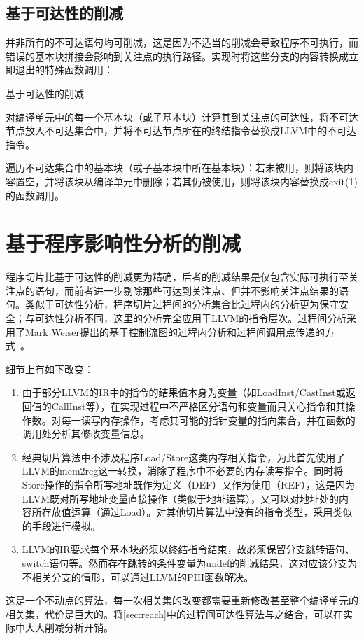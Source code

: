 \subsection{基于可达性的削减}
\label{subsec:reach-prune}

并非所有的不可达语句均可削减，这是因为不适当的削减会导致程序不可执行，而错误的基本块拼接会影响到关注点的执行路径。实现时将这些分支的内容转换成立即退出的特殊函数调用：
\begin{algorithm}\label{alg:reach-prune}
\caption{基于可达性的削减}
\SetAlgoNoLine
对编译单元中的每一个基本块（或子基本块）计算其到关注点的可达性，将不可达节点放入不可达集合中，并将不可达节点所在的终结指令替换成LLVM中的不可达指令。

遍历不可达集合中的基本块（或子基本块中所在基本块）：若未被用，则将该块内容置空，并将该块从编译单元中删除；若其仍被使用，则将该块内容替换成exit(1)的函数调用。
\end{algorithm}


\section{基于程序影响性分析的削减}
\label{sec:slicing}

程序切片比基于可达性的削减更为精确，后者的削减结果是仅包含实际可执行至关注点的语句，而前者进一步剔除那些可达到关注点、但并不影响关注点结果的语句。类似于可达性分析，程序切片过程间的分析集合比过程内的分析更为保守安全；与可达性分析不同，这里的分析完全应用于LLVM的指令层次。过程间分析采用了Mark Weiser提出的基于控制流图的过程内分析和过程间调用点传递的方式~。

细节上有如下改变：
\begin{enumerate}
\item 由于部分LLVM的IR中的指令的结果值本身为变量（如LoadInst/CastInst或返回值的CallInst等），在实现过程中不严格区分语句和变量而只关心指令和其操作数。对每一读写内存操作，考虑其可能的指针变量的指向集合，并在函数的调用处分析其修改变量信息。
\item 经典切片算法中不涉及程序Load/Store这类内存相关指令，为此首先使用了LLVM的mem2reg这一转换，消除了程序中不必要的内存读写指令。同时将Store操作的指令所写地址既作为定义（DEF）又作为使用（REF），这是因为LLVM既对所写地址变量直接操作（类似于地址运算），又可以对地址处的内容所存放值运算（通过Load）。对其他切片算法中没有的指令类型，采用类似的手段进行模拟。
\item LLVM的IR要求每个基本块必须以终结指令结束，故必须保留分支跳转语句、switch语句等。然而存在跳转的条件变量为undef的削减结果，这对应该分支为不相关分支的情形，可以通过LLVM的PHI函数解决。
\end{enumerate}
这是一个不动点的算法，每一次相关集的改变都需要重新修改甚至整个编译单元的相关集，代价是巨大的。将\autoref{sec:reach}中的过程间可达性算法与之结合，可以在实际中大大削减分析开销。

